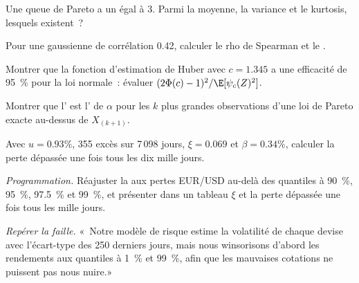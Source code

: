 \begin{exercise}[$\star$]\label{exo:qm:robust-statistics-and-heavy-tails:2}
Une queue de Pareto a un  égal à 3. Parmi la moyenne, la variance et le kurtosis, lesquels existent~?
\end{exercise}

\begin{exercise}[$\star$]\label{exo:qm:robust-statistics-and-heavy-tails:3}
Pour une  gaussienne de corrélation 0.42, calculer le rho de Spearman et le .
\end{exercise}

\begin{exercise}[$\star\star$]\label{exo:qm:robust-statistics-and-heavy-tails:4}
Montrer que la fonction d'estimation de Huber avec $c = 1.345$ a une efficacité de 95~\% pour la loi normale~: évaluer $(2\Phi(c) - 1)^2/\E[\psi_c(Z)^2]$.
\end{exercise}

\begin{exercise}[$\star\star$]\label{exo:qm:robust-statistics-and-heavy-tails:5}
Montrer que l' est l' de $\alpha$ pour les $k$ plus grandes observations d'une loi de Pareto exacte au-dessus de
$X_{(k+1)}$.
\end{exercise}

\begin{exercise}[$\star\star$]\label{exo:qm:robust-statistics-and-heavy-tails:6}
Avec $u = 0.93\%$, 355 excès sur 7\,098 jours, $\xi = 0.069$ et $\beta = 0.34\%$, calculer la perte dépassée une fois tous les dix mille jours.
\end{exercise}

\begin{exercise}[$\star\star\star$]\label{exo:qm:robust-statistics-and-heavy-tails:7}
\emph{Programmation.} Réajuster la  aux pertes EUR/USD au-delà des quantiles à 90~\%, 95~\%, 97.5~\% et 99~\%, et présenter dans un tableau $\xi$ et la
perte dépassée une fois tous les mille jours.
\end{exercise}

\begin{exercise}[$\star\star\star$]\label{exo:qm:robust-statistics-and-heavy-tails:8}
\emph{Repérer la faille.} «~Notre modèle de risque estime la volatilité de chaque devise avec l'écart-type des 250 derniers jours, mais nous
winsorisons d'abord les rendements aux quantiles à 1~\% et 99~\%, afin que les mauvaises cotations ne puissent pas nous nuire.»
\end{exercise}

